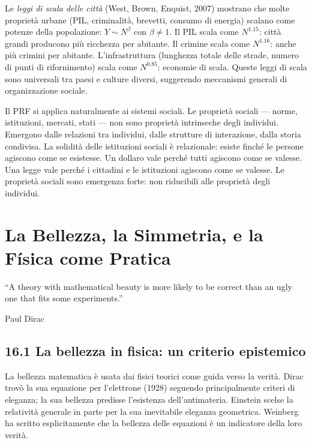\documentclass[11.5pt,a4paper,openany]{book}
\theoremstyle{remark}
\begin{document}
Le \textit{leggi di scala delle città} (West, Brown, Enquist, 2007) mostrano che molte proprietà urbane (PIL, criminalità, brevetti, consumo di energia) scalano come potenze della popolazione: $Y \sim N^\beta$ con $\beta \neq 1$. Il PIL scala come $N^{1.15}$: città grandi producono più ricchezza per abitante. Il crimine scala come $N^{1.16}$: anche più crimini per abitante. L'infrastruttura (lunghezza totale delle strade, numero di punti di rifornimento) scala come $N^{0.85}$: economie di scala. Queste leggi di scala sono universali tra paesi e culture diversi, suggerendo meccanismi generali di organizzazione sociale.

Il PRF si applica naturalmente ai sistemi sociali. Le proprietà sociali --- norme, istituzioni, mercati, stati --- non sono proprietà intrinseche degli individui. Emergono dalle relazioni tra individui, dalle strutture di interazione, dalla storia condivisa. La solidità delle istituzioni sociali è relazionale: esiste finché le persone agiscono come se esistesse. Un dollaro vale perché tutti agiscono come se valesse. Una legge vale perché i cittadini e le istituzioni agiscono come se valesse. Le proprietà sociali sono emergenza forte: non riducibili alle proprietà degli individui.

\chapter{La Bellezza, la Simmetria, e la Física come Pratica}

\epigraph{``A theory with mathematical beauty is more likely to be correct than an ugly one that fits some experiments.''}{Paul Dirac}

\section{16.1 La bellezza in fisica: un criterio epistemico}

La bellezza matematica è usata dai fisici teorici come guida verso la verità. Dirac trovò la sua equazione per l'elettrone (1928) seguendo principalmente criteri di eleganza; la sua bellezza predisse l'esistenza dell'antimateria. Einstein scelse la relatività generale in parte per la sua inevitabile eleganza geometrica. Weinberg ha scritto esplicitamente che la bellezza delle equazioni è un indicatore della loro verità.
\end{document}
